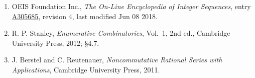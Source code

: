 \documentclass[11pt]{article}
\theoremstyle{definition}
\begin{document}
\begin{enumerate}

\item OEIS Foundation Inc., \emph{The On-Line Encyclopedia of Integer Sequences}, entry \href{https://oeis.org/A305685}{A305685}, revision 4, last modified Jun 08 2018.

\item R. P. Stanley, \emph{Enumerative Combinatorics}, Vol.~1, 2nd ed., Cambridge University Press, 2012; \S4.7.

\item J. Berstel and C. Reutenauer, \emph{Noncommutative Rational Series with Applications}, Cambridge University Press, 2011.

\end{enumerate}
\end{document}
